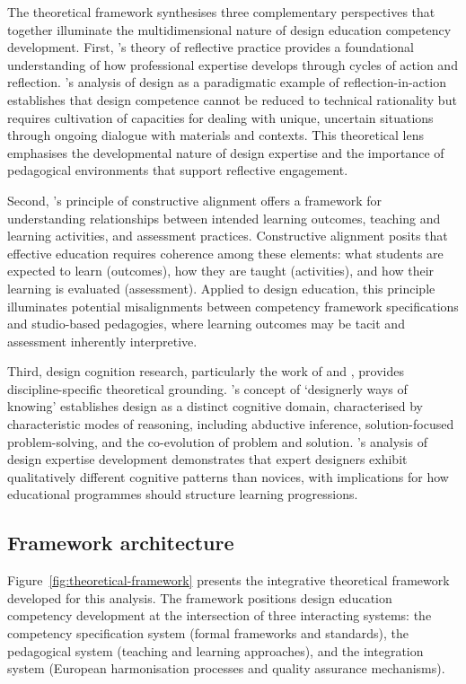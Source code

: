\documentclass[ed]{acnsart}
\begin{document}
	The theoretical framework synthesises three complementary perspectives that together illuminate the multidimensional nature of design education competency development. First, \citeauthor{Schon1983}'s \cite{Schon1983} theory of reflective practice provides a foundational understanding of how professional expertise develops through cycles of action and reflection. \citeauthor{Schon1983}'s analysis of design as a paradigmatic example of reflection-in-action establishes that design competence cannot be reduced to technical rationality but requires cultivation of capacities for dealing with unique, uncertain situations through ongoing dialogue with materials and contexts. This theoretical lens emphasises the developmental nature of design expertise and the importance of pedagogical environments that support reflective engagement.
	
	Second, \citeauthor{Biggs1996}'s \cite{Biggs1996} principle of constructive alignment offers a framework for understanding relationships between intended learning outcomes, teaching and learning activities, and assessment practices. Constructive alignment posits that effective education requires coherence among these elements: what students are expected to learn (outcomes), how they are taught (activities), and how their learning is evaluated (assessment). Applied to design education, this principle illuminates potential misalignments between competency framework specifications and studio-based pedagogies, where learning outcomes may be tacit and assessment inherently interpretive.
	
	Third, design cognition research, particularly the work of \citet{Cross2011} and \citet{Lawson2005}, provides discipline-specific theoretical grounding. \citeauthor{Cross2011}'s concept of `designerly ways of knowing' establishes design as a distinct cognitive domain, characterised by characteristic modes of reasoning, including abductive inference, solution-focused problem-solving, and the co-evolution of problem and solution. \citeauthor{Lawson2005}'s analysis of design expertise development demonstrates that expert designers exhibit qualitatively different cognitive patterns than novices, with implications for how educational programmes should structure learning progressions.
	
	\subsection{Framework architecture}
	
	Figure~\ref{fig:theoretical-framework} presents the integrative theoretical framework developed for this analysis. The framework positions design education competency development at the intersection of three interacting systems: the competency specification system (formal frameworks and standards), the pedagogical system (teaching and learning approaches), and the integration system (European harmonisation processes and quality assurance mechanisms).
	
\end{document}
